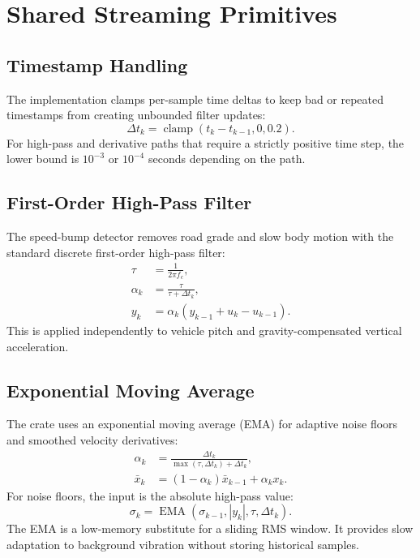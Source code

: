 \documentclass[11pt]{article}
\newcommand{\dt}{\Delta t}
\newcommand{\abs}[1]{\left|#1\right|}
\begin{document}
\section{Shared Streaming Primitives}

\subsection{Timestamp Handling}

The implementation clamps per-sample time deltas to keep bad or repeated
timestamps from creating unbounded filter updates:
\begin{equation}
  \dt_k = \operatorname{clamp}(t_k-t_{k-1}, 0, 0.2).
\end{equation}
For high-pass and derivative paths that require a strictly positive time step,
the lower bound is \(10^{-3}\) or \(10^{-4}\) seconds depending on the path.

\subsection{First-Order High-Pass Filter}

The speed-bump detector removes road grade and slow body motion with the
standard discrete first-order high-pass filter:
\begin{align}
  \tau &= \frac{1}{2\pi f_c},\\
  \alpha_k &= \frac{\tau}{\tau+\dt_k},\\
  y_k &= \alpha_k(y_{k-1}+u_k-u_{k-1}).
\end{align}
This is applied independently to vehicle pitch and gravity-compensated vertical
acceleration.

\subsection{Exponential Moving Average}

The crate uses an exponential moving average (EMA) for adaptive noise floors
and smoothed velocity derivatives:
\begin{align}
  \alpha_k &= \frac{\dt_k}{\max(\tau,\dt_k)+\dt_k},\\
  \bar{x}_k &= (1-\alpha_k)\bar{x}_{k-1}+\alpha_k x_k .
\end{align}
For noise floors, the input is the absolute high-pass value:
\begin{equation}
  \sigma_k = \operatorname{EMA}(\sigma_{k-1}, \abs{y_k}, \tau, \dt_k).
\end{equation}
The EMA is a low-memory substitute for a sliding RMS window. It provides slow
adaptation to background vibration without storing historical samples.
\end{document}
